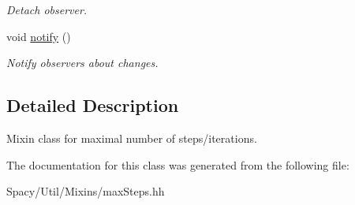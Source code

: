 \begin{DoxyCompactItemize}
\begin{DoxyCompactList}\small\item\em Detach observer. \end{DoxyCompactList}\item 
\hypertarget{classSpacy_1_1Mixin_1_1MixinConnection_a1ddeaa78a3bb4a38c2cca36d1f99fe36}{}void \hyperlink{classSpacy_1_1Mixin_1_1MixinConnection_a1ddeaa78a3bb4a38c2cca36d1f99fe36}{notify} ()\label{classSpacy_1_1Mixin_1_1MixinConnection_a1ddeaa78a3bb4a38c2cca36d1f99fe36}

\begin{DoxyCompactList}\small\item\em Notify observers about changes. \end{DoxyCompactList}\end{DoxyCompactItemize}


\subsection{Detailed Description}
Mixin class for maximal number of steps/iterations. 

The documentation for this class was generated from the following file\+:\begin{DoxyCompactItemize}
\item 
Spacy/\+Util/\+Mixins/max\+Steps.\+hh\end{DoxyCompactItemize}
